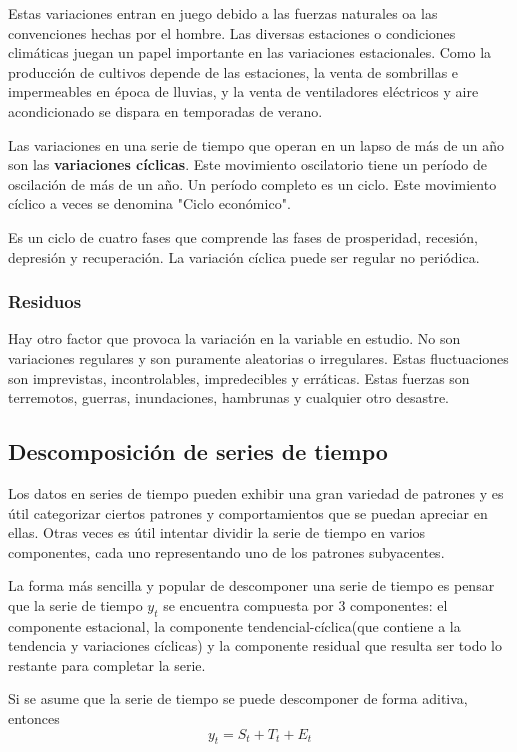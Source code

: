     Estas variaciones entran en juego debido a las fuerzas naturales oa las convenciones hechas por el hombre. Las diversas estaciones o condiciones climáticas juegan un papel 
    importante en las variaciones estacionales. Como la producción de cultivos depende de las estaciones, la venta de sombrillas e impermeables en época de lluvias, 
    y la venta de ventiladores eléctricos y aire acondicionado se dispara en temporadas de verano.

    Las variaciones en una serie de tiempo que operan en un lapso de más de un año son las \textbf{variaciones cíclicas}. Este movimiento oscilatorio tiene un período de oscilación de más de un año.
    Un período completo es un ciclo. Este movimiento cíclico a veces se denomina "Ciclo económico".

    Es un ciclo de cuatro fases que comprende las fases de prosperidad, recesión, depresión y recuperación. La variación cíclica puede ser regular no periódica.

    \subsubsection{Residuos}
    
    Hay otro factor que provoca la variación en la variable en estudio. No son variaciones regulares y son puramente aleatorias o irregulares. 
    Estas fluctuaciones son imprevistas, incontrolables, impredecibles y erráticas. Estas fuerzas son terremotos, guerras, inundaciones, hambrunas y cualquier otro desastre.

    \subsection{Descomposición de series de tiempo}
    Los datos en series de tiempo pueden exhibir una gran variedad de patrones y es útil categorizar ciertos patrones 
    y comportamientos que se puedan apreciar en ellas. Otras veces es útil intentar dividir la serie de tiempo en varios componentes,
    cada uno representando uno de los patrones subyacentes\cite{20}.

    La forma más sencilla y popular de descomponer una serie de tiempo es pensar que la serie de tiempo $y_t$ se encuentra compuesta por 
    3 componentes: el componente estacional, la componente tendencial-cíclica(que contiene a la tendencia y variaciones cíclicas) y la componente residual que resulta ser
    todo lo restante para completar la serie\cite{20}.

    Si se asume que la serie de tiempo se puede descomponer de forma aditiva, entonces
    \begin{equation}
        y_t = S_t + T_t + E_t
     \end{equation}
        
